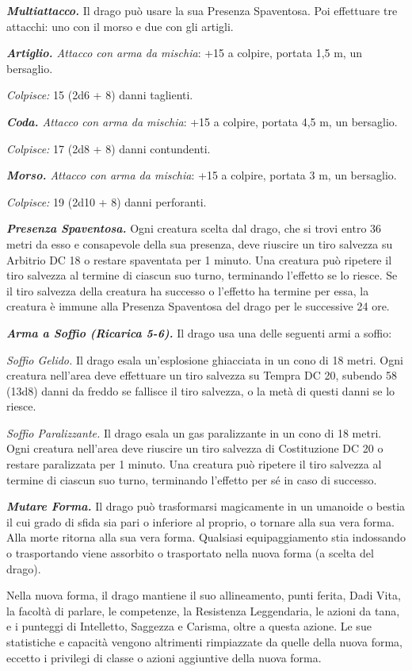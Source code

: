\begin{multicols}{2}
\emph{\textbf{Multiattacco.}} Il drago può usare la sua Presenza
Spaventosa. Poi effettuare tre attacchi: uno con il morso e due con gli
artigli.

\emph{\textbf{Artiglio.} Attacco con arma da mischia}: +15 a colpire,
portata 1,5 m, un bersaglio.

\emph{Colpisce:} 15 (2d6 + 8) danni taglienti.

\emph{\textbf{Coda.} Attacco con arma da mischia}: +15 a colpire,
portata 4,5 m, un bersaglio.

\emph{Colpisce:} 17 (2d8 + 8) danni contundenti.

\emph{\textbf{Morso.} Attacco con arma da mischia}: +15 a colpire,
portata 3 m, un bersaglio.

\emph{Colpisce:} 19 (2d10 + 8) danni perforanti.

\emph{\textbf{Presenza Spaventosa.}} Ogni creatura scelta dal drago, che
si trovi entro 36 metri da esso e consapevole della sua presenza, deve
riuscire un tiro salvezza su Arbitrio DC 18 o restare spaventata per 1
minuto. Una creatura può ripetere il tiro salvezza al termine di ciascun
suo turno, terminando l'effetto se lo riesce. Se il tiro salvezza della
creatura ha successo o l'effetto ha termine per essa, la creatura è
immune alla Presenza Spaventosa del drago per le successive 24 ore.

\emph{\textbf{Arma a Soffio (Ricarica 5-6).}} Il drago usa una delle
seguenti armi a soffio:

\emph{Soffio Gelido.} Il drago esala un'esplosione ghiacciata in un cono
di 18 metri. Ogni creatura nell'area deve effettuare un tiro salvezza su Tempra DC 20, subendo 58 (13d8) danni da freddo se fallisce il
tiro salvezza, o la metà di questi danni se lo riesce.

\emph{Soffio Paralizzante.} Il drago esala un gas paralizzante in un
cono di 18 metri. Ogni creatura nell'area deve riuscire un tiro salvezza
di Costituzione DC 20 o restare paralizzata per 1 minuto. Una creatura
può ripetere il tiro salvezza al termine di ciascun suo turno,
terminando l'effetto per sé in caso di successo.

\emph{\textbf{Mutare Forma.}} Il drago può trasformarsi magicamente in
un umanoide o bestia il cui grado di sfida sia pari o inferiore al
proprio, o tornare alla sua vera forma. Alla morte ritorna alla sua vera
forma. Qualsiasi equipaggiamento stia indossando o trasportando viene
assorbito o trasportato nella nuova forma (a scelta del drago).

Nella nuova forma, il drago mantiene il suo allineamento, punti ferita,
Dadi Vita, la facoltà di parlare, le competenze, la Resistenza
Leggendaria, le azioni da tana, e i punteggi di Intelletto, Saggezza e
Carisma, oltre a questa azione. Le sue statistiche e capacità vengono
altrimenti rimpiazzate da quelle della nuova forma, eccetto i privilegi
di classe o azioni aggiuntive della nuova forma.


\end{multicols}
